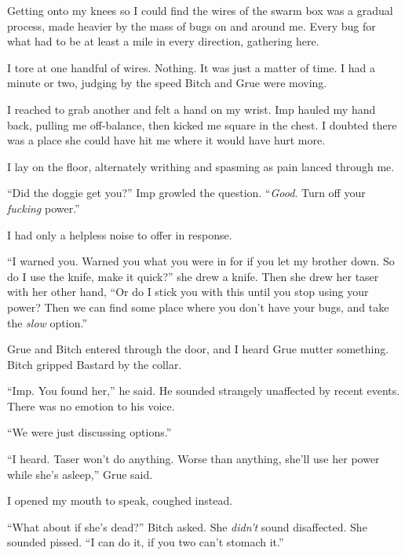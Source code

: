 Getting onto my knees so I could find the wires of the swarm box was a gradual process, made heavier by the mass of bugs on and around me.  Every bug for what had to be at least a mile in every direction, gathering here.



I tore at one handful of wires.  Nothing.  It was just a matter of time.  I had a minute or two, judging by the speed Bitch and Grue were moving.



I reached to grab another and felt a hand on my wrist.  Imp hauled my hand back, pulling me off-balance, then kicked me square in the chest.  I doubted there was a place she could have hit me where it would have hurt more.



I lay on the floor, alternately writhing and spasming as pain lanced through me.



``Did the doggie get you?'' Imp growled the question.  ``\emph{Good}.  Turn off your \emph{fucking} power.''



I had only a helpless noise to offer in response.



``I warned you.  Warned you what you were in for if you let my brother down.  So do I use the knife, make it quick?'' she drew a knife.  Then she drew her taser with her other hand, ``Or do I stick you with this until you stop using your power?  Then we can find some place where you don't have your bugs, and take the \emph{slow} option.''



Grue and Bitch entered through the door, and I heard Grue mutter something.  Bitch gripped Bastard by the collar.



``Imp.  You found her,'' he said.  He sounded strangely unaffected by recent events.  There was no emotion to his voice.



``We were just discussing options.''



``I heard.  Taser won't do anything.  Worse than anything, she'll use her power while she's asleep,'' Grue said.



I opened my mouth to speak, coughed instead.



``What about if she's dead?'' Bitch asked.  She \emph{didn't} sound disaffected.  She sounded pissed.  ``I can do it, if you two can't stomach it.''



